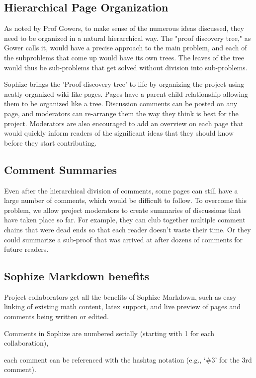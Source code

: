 \documentclass[a4paper]{article}
\begin{document}
\subsection{Hierarchical Page Organization}

As noted by Prof Gowers, to make sense of the numerous ideas discussed, they need to be organized in a natural hierarchical way. The "proof discovery tree," as Gower calls it, would have a precise approach to the main problem, and each of the subproblems that come up would have its own trees. The leaves of the tree would thus be sub-problems that get solved without division into sub-problems.


Sophize brings the 'Proof-discovery tree' to life by organizing the project using neatly organized wiki-like pages. Pages have a parent-child relationship allowing them to be organized like a tree. Discussion comments can be posted on any page, and moderators can re-arrange them the way they think is best for the project. Moderators are also encouraged to add an overview on each page that would quickly inform readers of the significant ideas that they should know before they start contributing.


\subsection{Comment Summaries}

Even after the hierarchical division of comments, some pages can still have a large number of comments, which would be difficult to follow. To overcome this problem, we allow project moderators to create summaries of discussions that have taken place so far. For example, they can club together multiple comment chains that were dead ends so that each reader doesn't waste their time. Or they could summarize a sub-proof that was arrived at after dozens of comments for future readers.


\subsection{Sophize Markdown benefits}

Project collaborators get all the benefits of Sophize Markdown, such as easy linking of existing math content, latex support, and live preview of pages and comments being written or edited.


Comments in Sophize are numbered serially (starting with 1 for each collaboration),

each comment can be referenced with the hashtag notation (e.g., `\#3' for the 3rd comment).
\end{document}

